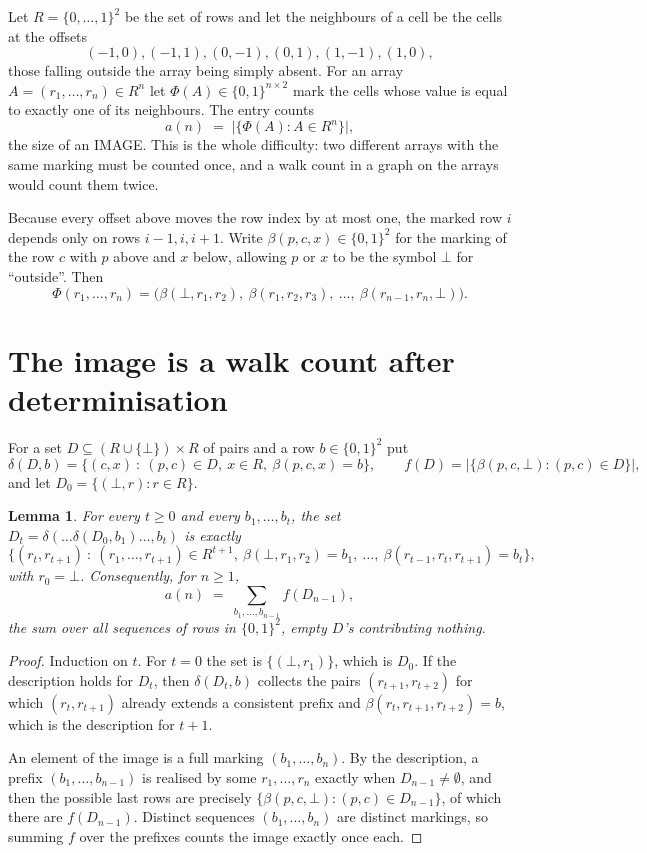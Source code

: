 \documentclass[11pt,a4paper]{article}
\theoremstyle{plain}
\newtheorem{lemma}[theorem]{Lemma}
\theoremstyle{definition}
\begin{document}
Let $R=\{0,\dots,1\}^{2}$ be the set of rows and let the neighbours of a cell be the
cells at the offsets
\[
(-1,0), (-1,1), (0,-1), (0,1), (1,-1), (1,0),
\]
those falling outside the array being simply absent. For an array
$A=(r_1,\dots,r_n)\in R^n$ let $\Phi(A)\in\{0,1\}^{n\times2}$ mark the cells whose value
is equal to exactly one of its neighbours. The entry counts
\[
a(n)\;=\;\bigl|\{\Phi(A):A\in R^n\}\bigr| ,
\]
the size of an IMAGE. This is the whole difficulty: two different arrays with the same marking
must be counted once, and a walk count in a graph on the arrays would count them twice.

Because every offset above moves the row index by at most one, the marked row $i$ depends only
on rows $i-1,i,i+1$. Write $\beta(p,c,x)\in\{0,1\}^{2}$ for the marking of the row $c$
with $p$ above and $x$ below, allowing $p$ or $x$ to be the symbol $\bot$ for ``outside''.
Then
\[
\Phi(r_1,\dots,r_n)=\bigl(\beta(\bot,r_1,r_2),\ \beta(r_1,r_2,r_3),\ \dots,\
\beta(r_{n-1},r_n,\bot)\bigr).
\]

\section{The image is a walk count after determinisation}

For a set $D\subseteq(R\cup\{\bot\})\times R$ of pairs and a row $b\in\{0,1\}^{2}$ put
\[
\delta(D,b)=\{(c,x)\ :\ (p,c)\in D,\ x\in R,\ \beta(p,c,x)=b\},\qquad
f(D)=\bigl|\{\beta(p,c,\bot):(p,c)\in D\}\bigr| ,
\]
and let $D_0=\{(\bot,r):r\in R\}$.

\begin{lemma}\label{lem:det}
For every $t\ge0$ and every $b_1,\dots,b_t$, the set
$D_t=\delta(\dots\delta(D_0,b_1)\dots,b_t)$ is exactly
\[
\{(r_t,r_{t+1})\ :\ (r_1,\dots,r_{t+1})\in R^{t+1},\ \beta(\bot,r_1,r_2)=b_1,\ \dots,\
\beta(r_{t-1},r_t,r_{t+1})=b_t\} ,
\]
with $r_0=\bot$. Consequently, for $n\ge1$,
\[
a(n)\;=\;\sum_{b_1,\dots,b_{n-1}}f(D_{n-1}),
\]
the sum over all sequences of rows in $\{0,1\}^{2}$, empty $D$'s contributing nothing.
\end{lemma}

\begin{proof}
Induction on $t$. For $t=0$ the set is $\{(\bot,r_1)\}$, which is $D_0$. If the description
holds for $D_t$, then $\delta(D_t,b)$ collects the pairs $(r_{t+1},r_{t+2})$ for which
$(r_t,r_{t+1})$ already extends a consistent prefix and
$\beta(r_t,r_{t+1},r_{t+2})=b$, which is the description for $t+1$.

An element of the image is a full marking $(b_1,\dots,b_n)$. By the description, a prefix
$(b_1,\dots,b_{n-1})$ is realised by some $r_1,\dots,r_n$ exactly when $D_{n-1}\neq
\emptyset$, and then the possible last rows are precisely
$\{\beta(p,c,\bot):(p,c)\in D_{n-1}\}$, of which there are $f(D_{n-1})$. Distinct
sequences $(b_1,\dots,b_n)$ are distinct markings, so summing $f$ over the prefixes counts the
image exactly once each.
\end{proof}
\end{document}
